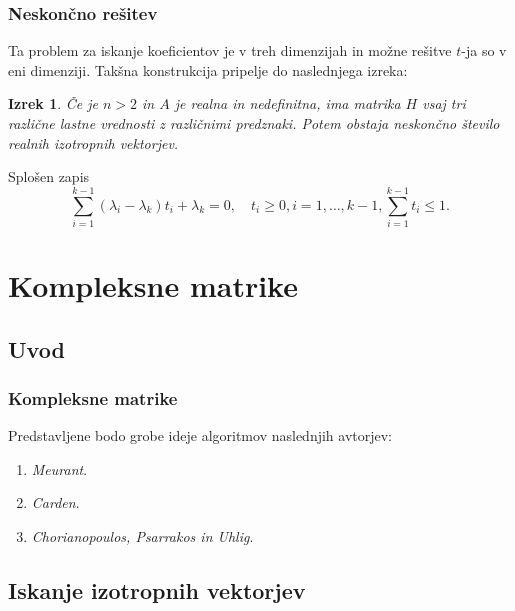 \documentclass{beamer}
\newtheorem{izrek}{Izrek}
\begin{document}
\begin{frame}
\frametitle{Neskončno rešitev}
Ta problem za iskanje koeficientov je v treh dimenzijah in možne rešitve $t$-ja so v eni dimenziji. Takšna konstrukcija pripelje do naslednjega izreka:
\begin{izrek}
Če je $n>2$ in $A$ je realna in nedefinitna, ima matrika $H$ vsaj tri različne lastne vrednosti z različnimi predznaki. Potem obstaja neskončno število realnih izotropnih vektorjev.
\end{izrek}\pause
\begin{block}{Splošen zapis}
\begin{equation*}
\sum_{i=1}^{k-1} (\lambda_i -\lambda_k)t_i +\lambda_k =0, \quad t_i\ge0, i=1, \dots,k-1, \sum_{i=1}^{k-1}t_i \le1.
\end{equation*}
\end{block}
\end{frame}
\section{Kompleksne matrike}
\subsection{Uvod}
\begin{frame}
\frametitle{Kompleksne matrike}
Predstavljene bodo grobe ideje algoritmov naslednjih avtorjev:
\begin{enumerate}
\item \emph{Meurant}.
\item \emph{Carden}.
\item \emph{Chorianopoulos, Psarrakos in Uhlig}.
\end{enumerate}
\end{frame}
\subsection{Iskanje izotropnih vektorjev}
\end{document}
